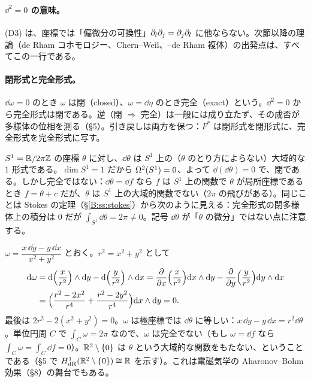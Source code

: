 \paragraph{$\dd^2=0$ の意味。}(D3) は、座標では「偏微分の可換性」$\partial_l\partial_j=\partial_j\partial_l$ に他ならない。次節以降の理論（de Rham コホモロジー、Chern--Weil、{\Cech}--de Rham 複体）の出発点は、すべてこの一行である。

\paragraph{閉形式と完全形式。}$\dd\omega=0$ のとき $\omega$ は閉（closed）、$\omega=\dd\eta$ のとき完全（exact）という。$\dd^2=0$ から完全形式は閉である。逆（閉 $\Rightarrow$ 完全）は一般には成り立たず、その成否が多様体の位相を測る（§5）。引き戻しは両方を保つ：$F^*$ は閉形式を閉形式に、完全形式を完全形式に写す。

\begin{ex}[$S^1$ 上の $\dd\theta$]\label{B:ex:dtheta}
$S^1=\mathbb R/2\pi\mathbb Z$ の座標 $\theta$ に対し、$\dd\theta$ は $S^1$ 上の（$\theta$ のとり方によらない）大域的な $1$ 形式である。$\dim S^1=1$ だから $\Omega^2(S^1)=0$、よって $\dd(\dd\theta)=0$ で、閉である。しかし完全ではない：$\dd\theta=\dd f$ なら $f$ は $S^1$ 上の関数で $\theta$ が局所座標であるとき $f=\theta+c$ だが、$\theta$ は $S^1$ 上の大域的関数でない（$2\pi$ の飛びがある）。同じことは Stokes の定理（\S\ref{B:ss:stokes}）から次のように見える：完全形式の閉多様体上の積分は $0$ だが $\int_{S^1}\dd\theta=2\pi\ne0$。記号 $\dd\theta$ が「$\theta$ の微分」ではない点に注意する。
\end{ex}

\begin{ex}\label{B:ex:angle}
$\omega=\dfrac{x\,\dd y-y\,\dd x}{x^2+y^2}$ とおく。$r^2=x^2+y^2$ として
\begin{align*}
\mathrm{d}\omega&=\mathrm{d}\Bigl(\frac{x}{r^2}\Bigr)\wedge\mathrm{d} y-\mathrm{d}\Bigl(\frac{y}{r^2}\Bigr)\wedge\mathrm{d} x
=\frac{\partial}{\partial x}\Bigl(\frac{x}{r^2}\Bigr)\mathrm{d} x\wedge\mathrm{d} y-\frac{\partial}{\partial y}\Bigl(\frac{y}{r^2}\Bigr)\mathrm{d} y\wedge\mathrm{d} x\\
&=\Bigl(\frac{r^2-2x^2}{r^4}+\frac{r^2-2y^2}{r^4}\Bigr)\mathrm{d} x\wedge\mathrm{d} y=0 .
\end{align*}
最後は $2r^2-2(x^2+y^2)=0$。$\omega$ は極座標では $\dd\theta$ に等しい：$x\,\dd y-y\,\dd x=r^2\dd\theta$。単位円周 $C$ で $\int_C\omega=2\pi$ なので、$\omega$ は完全でない（もし $\omega=\dd f$ なら $\int_C\omega=\int_C\dd f=0$）。$\mathbb R^2\setminus\{0\}$ は $\theta$ という大域的な関数をもたない、ということである（§5 で $H^1_{\rm dR}(\mathbb R^2\setminus\{0\})\cong\mathbb R$ を示す）。これは電磁気学の Aharonov--Bohm 効果（§8）の舞台でもある。
\end{ex}

